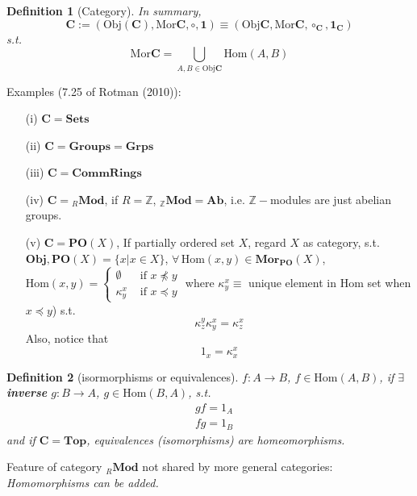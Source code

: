 \documentclass[10pt]{amsart}
\newtheorem{definition}{Definition}
\begin{document}
\begin{multicols*}{2}
\begin{definition}[Category]
In summary, 
\begin{equation}
	\mathbf{C} := (\text{Obj}(\mathbf{C}), \text{Mor}\mathbf{C}, \circ, \mathbf{1}) \equiv (\text{Obj}\mathbf{C}, \text{Mor}\mathbf{C}, \circ_{\mathbf{C}}, \mathbf{1}_{\mathbf{C}})
\end{equation}
s.t. 
\[
\text{Mor}\mathbf{C} = \bigcup_{A,B \in \text{Obj}\mathbf{C}} \text{Hom}(A,B)
\]
\end{definition}

Examples (7.25 of Rotman (2010)\cite{JRotman2010}): 
\begin{enumerate}
\item[(i)] $\mathbf{C} = \mathbf{\text{Sets}}$  
\item[(ii)] $\mathbf{C} = \mathbf{\text{Groups}} = \mathbf{\text{Grps}}$ 
\item[(iii)]  $\mathbf{C} = \mathbf{\text{CommRings}}$
\item[(iv)]  $\mathbf{C} = {}_R\textbf{Mod}$, if $R=\mathbb{Z}$, ${}_{\mathbb{Z}}\textbf{Mod} = \textbf{Ab}$, i.e. $\mathbb{Z}-$modules are just abelian groups.   
\item[(v)] $\mathbf{C} =\textbf{PO}(X)$, If partially ordered set $X$, regard $X$ as category, s.t. $\textbf{Obj}, \textbf{PO}(X) = \lbrace x | x\in X\rbrace$, $\forall \, \text{Hom}(x,y) \in \textbf{Mor}_{\textbf{PO}}(X)$, $\text{Hom}(x,y) = \begin{cases} \emptyset & \text{ if } x \npreceq y \\  \kappa_y^x & \text{ if } x \preceq y   \end{cases}$ where $\kappa_y^x \equiv $ unique element in $\text{Hom}$ set when $x \preceq y$) s.t. 
\[
\kappa_z^y \kappa_y^x  =\kappa_z^x
\]
Also, notice that 
\[
1_x = \kappa_x^x
\]
\end{enumerate}

\begin{definition}[isormorphisms or equivalences]
$f:A\to B$, $f\in \text{Hom}(A,B)$, if $\exists \, $ \textbf{inverse} $g:B\to A$, $g\in \text{Hom}(B,A)$, s.t. 
\[
\begin{aligned}
& gf = 1_A \\ 
& fg = 1_B
\end{aligned}
\]
and if $\mathbf{C} = \textbf{Top}$, equivalences (isomorphisms) are homeomorphisms.  
\end{definition}

Feature of category ${}_R\textbf{Mod}$ not shared by more general categories: \emph{Homomorphisms can be added.}


\end{multicols*}
\end{document}

